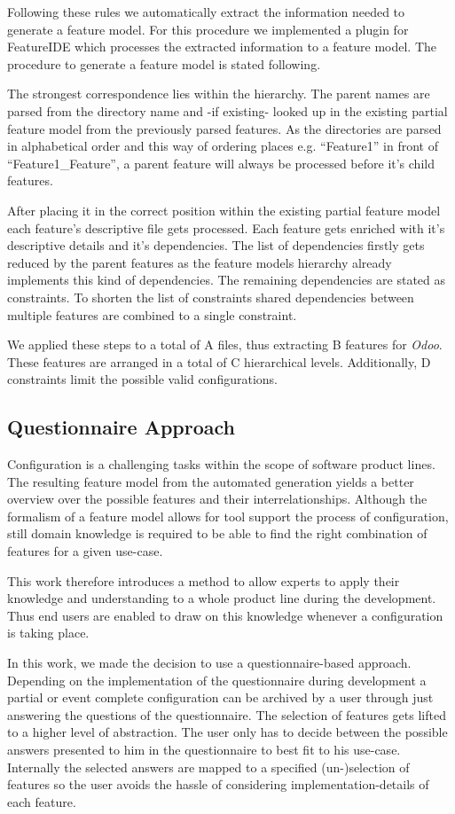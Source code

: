 Following these rules we automatically extract the information needed to generate a feature model. For this procedure we implemented a plugin for FeatureIDE which processes the extracted information to a feature model. The procedure to generate a feature model is stated following.

The strongest correspondence lies within the hierarchy. The parent names are parsed from the directory name and -if existing- looked up in the existing partial feature model from the previously parsed features. As the directories are parsed in alphabetical order and this way of ordering places e.g. ``Feature1'' in front of ``Feature1\_Feature'', a parent feature will always be processed before it's child features.

After placing it in the correct position within the existing partial feature model each feature's descriptive file gets processed. Each feature gets enriched with it's descriptive details and it's dependencies. The list of dependencies firstly gets reduced by the parent features as the feature models hierarchy already implements this kind of dependencies. The remaining dependencies are stated as constraints. To shorten the list of constraints shared dependencies between multiple features are combined to a single constraint.

We applied these steps to a total of A files, thus extracting B features for \textit{Odoo}. These features are arranged in a total of C hierarchical levels. Additionally, D constraints limit the possible valid configurations.

\subsection{Questionnaire Approach}
Configuration is a challenging tasks within the scope of software product lines. The resulting feature model from the automated generation yields a better overview over the possible features and their interrelationships. Although the formalism of a feature model allows for tool support the process of configuration, still domain knowledge is required to be able to find the right combination of features for a given use-case.

This work therefore introduces a method to allow experts to apply their knowledge and understanding to a whole product line during the development. Thus end users are enabled to draw on this knowledge whenever a configuration is taking place.

In this work, we made the decision to use a questionnaire-based approach. Depending on the implementation of the questionnaire during development a partial or event complete configuration can be archived by a user through just answering the questions of the questionnaire. The selection of features gets lifted to a higher level of abstraction. The user only has to decide between the possible answers presented to him in the questionnaire to best fit to his use-case. Internally the selected answers are mapped to a specified (un-)selection of features so the user avoids the hassle of considering implementation-details of each feature.

